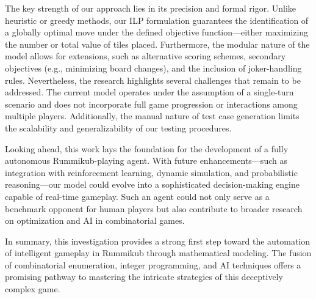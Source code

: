 \documentclass[11pt,letterpaper]{article}
\begin{document}
The key strength of our approach lies in its precision and formal rigor. Unlike heuristic or greedy methods, our ILP formulation guarantees the identification of a globally optimal move under the defined objective function—either maximizing the number or total value of tiles placed. Furthermore, the modular nature of the model allows for extensions, such as alternative scoring schemes, secondary objectives (e.g., minimizing board changes), and the inclusion of joker-handling rules.
Nevertheless, the research highlights several challenges that remain to be addressed. The current model operates under the assumption of a single-turn scenario and does not incorporate full game progression or interactions among multiple players. Additionally, the manual nature of test case generation limits the scalability and generalizability of our testing procedures.

Looking ahead, this work lays the foundation for the development of a fully autonomous Rummikub-playing agent. With future enhancements—such as integration with reinforcement learning, dynamic simulation, and probabilistic reasoning—our model could evolve into a sophisticated decision-making engine capable of real-time gameplay. Such an agent could not only serve as a benchmark opponent for human players but also contribute to broader research on optimization and AI in combinatorial games.

In summary, this investigation provides a strong first step toward the automation of intelligent gameplay in Rummikub through mathematical modeling. The fusion of combinatorial enumeration, integer programming, and AI techniques offers a promising pathway to mastering the intricate strategies of this deceptively complex game.

\bigskip



\end{document}
